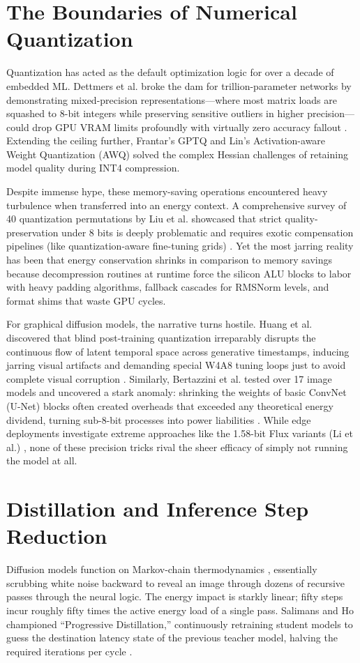 \documentclass[12pt, a4paper]{report}
\begin{document}
\section{The Boundaries of Numerical Quantization}
Quantization has acted as the default optimization logic for over a decade of embedded ML. Dettmers et al. broke the dam for trillion-parameter networks by demonstrating mixed-precision representations—where most matrix loads are squashed to 8-bit integers while preserving sensitive outliers in higher precision—could drop GPU VRAM limits profoundly with virtually zero accuracy fallout \cite{dettmers2022gptint8}. Extending the ceiling further, Frantar’s GPTQ \cite{frantar2023gptq} and Lin’s Activation-aware Weight Quantization (AWQ) \cite{lin2024awq} solved the complex Hessian challenges of retaining model quality during INT4 compression.

Despite immense hype, these memory-saving operations encountered heavy turbulence when transferred into an energy context. A comprehensive survey of 40 quantization permutations by Liu et al. showcased that strict quality-preservation under 8 bits is deeply problematic and requires exotic compensation pipelines (like quantization-aware fine-tuning grids) \cite{liu2024survey}. Yet the most jarring reality has been that energy conservation shrinks in comparison to memory savings because decompression routines at runtime force the silicon ALU blocks to labor with heavy padding algorithms, fallback cascades for RMSNorm levels, and format shims that waste GPU cycles.

For graphical diffusion models, the narrative turns hostile. Huang et al. discovered that blind post-training quantization irreparably disrupts the continuous flow of latent temporal space across generative timestamps, inducing jarring visual artifacts and demanding special W4A8 tuning loops just to avoid complete visual corruption \cite{huang2024tfmqdm}. Similarly, Bertazzini et al. tested over 17 image models and uncovered a stark anomaly: shrinking the weights of basic ConvNet (U-Net) blocks often created overheads that exceeded any theoretical energy dividend, turning sub-8-bit processes into power liabilities \cite{bertazzini2025hidden}. While edge deployments investigate extreme approaches like the 1.58-bit Flux variants (Li et al.) \cite{li2024158bitflux}, none of these precision tricks rival the sheer efficacy of simply not running the model at all.

\section{Distillation and Inference Step Reduction}
Diffusion models function on Markov-chain thermodynamics \cite{rombach2022ldm}, essentially scrubbing white noise backward to reveal an image through dozens of recursive passes through the neural logic. The energy impact is starkly linear; fifty steps incur roughly fifty times the active energy load of a single pass. Salimans and Ho championed ``Progressive Distillation,'' continuously retraining student models to guess the destination latency state of the previous teacher model, halving the required iterations per cycle \cite{salimans2022progressive}. 
\end{document}
